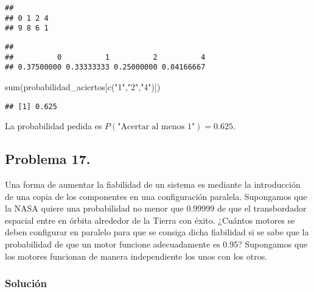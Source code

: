 \documentclass[
]{article}
\newenvironment{Shaded}{\begin{snugshade}}{\end{snugshade}}
\newcommand{\FunctionTok}[1]{\textcolor[rgb]{0.00,0.00,0.00}{#1}}
\newcommand{\NormalTok}[1]{#1}
\newcommand{\OtherTok}[1]{\textcolor[rgb]{0.56,0.35,0.01}{#1}}
\newcommand{\SpecialCharTok}[1]{\textcolor[rgb]{0.00,0.00,0.00}{#1}}
\newcommand{\StringTok}[1]{\textcolor[rgb]{0.31,0.60,0.02}{#1}}
\begin{document}
\begin{verbatim}
## 
## 0 1 2 4 
## 9 8 6 1
\end{verbatim}

\begin{Shaded}
\end{Shaded}

\begin{verbatim}
## 
##          0          1          2          4 
## 0.37500000 0.33333333 0.25000000 0.04166667
\end{verbatim}

\begin{Shaded}
\begin{Highlighting}[]
\FunctionTok{sum}\NormalTok{(probabilidad\_aciertos[}\FunctionTok{c}\NormalTok{(}\StringTok{"1"}\NormalTok{,}\StringTok{"2"}\NormalTok{,}\StringTok{"4"}\NormalTok{)])}
\end{Highlighting}
\end{Shaded}

\begin{verbatim}
## [1] 0.625
\end{verbatim}

La probabilidad pedida es \(P(\mbox{"Acertar al menos 1"})=0.625\).

\hypertarget{problema-17.}{%
\subsection{Problema 17.}\label{problema-17.}}

Una forma de aumentar la fiabilidad de un sistema es mediante la
introducción de una copia de los componentes en una configuración
paralela. Supongamos que la NASA quiere una probabilidad no menor que
0.99999 de que el transbordador espacial entre en órbita alrededor de la
Tierra con éxito. ¿Cuántos motores se deben configurar en paralelo para
que se consiga dicha fiabilidad si se sabe que la probabilidad de que un
motor funcione adecuadamente es 0.95? Supongamos que los motores
funcionan de manera independiente los unos con los otros.

\hypertarget{soluciuxf3n-17}{%
\subsubsection{Solución}\label{soluciuxf3n-17}}
\end{document}
